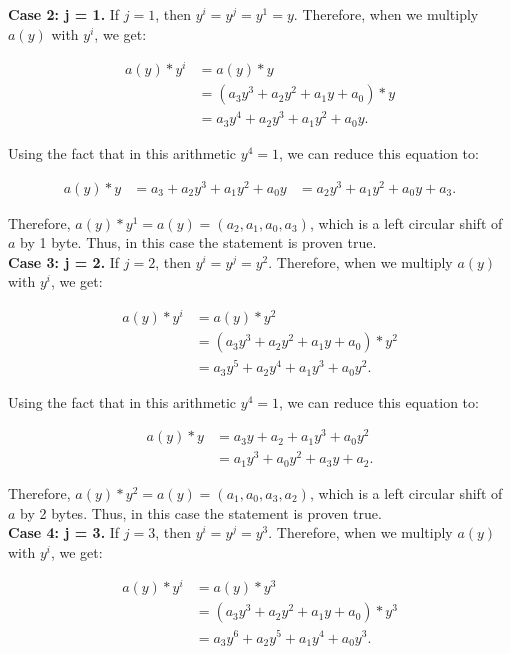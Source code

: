 \documentclass[11pt]{article}
\theoremstyle{definition}
\begin{document}
\begin{enumerate}
\begin{enumerate}
\begin{enumerate}
\textbf{Case 2: j = 1.}
If $j = 1$, then $y^i = y^j = y^1 = y$. Therefore, when we multiply $a(y)$ with $y^i$, we get:

\begin{align*}
    a(y) * y^i &= a(y) * y \\
    &= (a_3y^3 + a_2y^2 + a_1y + a_0) * y \\
    &= a_3y^4 + a_2y^3 + a_1y^2 + a_0y.
\end{align*}

Using the fact that in this arithmetic $y^4 = 1$, we can reduce this equation to:

\begin{align*}
    a(y) * y &= a_3 + a_2y^3 + a_1y^2 + a_0y
    &= a_2y^3 + a_1y^2 + a_0y + a_3.
\end{align*}

Therefore, $a(y) * y^1 = a(y) = (a_2, a_1, a_0, a_3)$, which is a left  circular shift of $a$ by 1 byte. Thus, in this case the statement is proven true.
\\

\textbf{Case 3: j = 2.}
If $j = 2$, then $y^i = y^j = y^2$. Therefore, when we multiply $a(y)$ with $y^i$, we get:

\begin{align*}
    a(y) * y^i &= a(y) * y^2 \\
    &= (a_3y^3 + a_2y^2 + a_1y + a_0) * y^2 \\
    &= a_3y^5 + a_2y^4 + a_1y^3 + a_0y^2.
\end{align*}

Using the fact that in this arithmetic $y^4 = 1$, we can reduce this equation to:

\begin{align*}
    a(y) * y &= a_3y + a_2 + a_1y^3 + a_0y^2 \\
    &= a_1y^3 + a_0y^2 + a_3y + a_2.
\end{align*}

Therefore, $a(y) * y^2 = a(y) = (a_1, a_0, a_3, a_2)$, which is a left  circular shift of $a$ by 2 bytes. Thus, in this case the statement is proven true.
\\

\textbf{Case 4: j = 3.}
If $j = 3$, then $y^i = y^j = y^3$. Therefore, when we multiply $a(y)$ with $y^i$, we get:

\begin{align*}
    a(y) * y^i &= a(y) * y^3 \\
    &= (a_3y^3 + a_2y^2 + a_1y + a_0) * y^3 \\
    &= a_3y^6 + a_2y^5 + a_1y^4 + a_0y^3.
\end{align*}


\end{enumerate}
\end{enumerate}
\end{enumerate}
\end{document}
